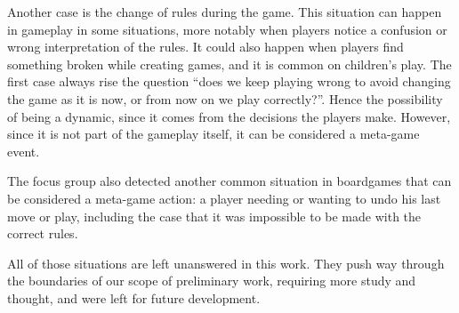 Another case is the change of rules during the game.
This situation can happen in gameplay in some situations,
more notably when players notice a confusion or wrong
interpretation of the rules. It could also happen when players
find something broken while creating games, and it is
common on children’s play. The first case always rise the
question “does we keep playing wrong to avoid changing
the game as it is now, or from now on we play correctly?”.
Hence the possibility of being a dynamic, since it comes
from the decisions the players make. However, since it is
not part of the gameplay itself, it can be considered a meta-game
event.

The focus group also detected another common situation
in boardgames that can be considered a meta-game action:
a player needing or wanting to undo his last move or play,
including the case that it was impossible to be made with
the correct rules. 

All of those situations are left unanswered in this work.
They push way through the boundaries of our scope of
preliminary work, requiring more study and thought, and
were left for future development.